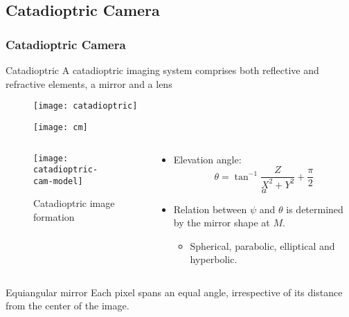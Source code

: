 \subsection{Catadioptric Camera}

\begin{frame}
\frametitle{Catadioptric Camera}
\begin{block}{Catadioptric}
A catadioptric imaging system comprises both reflective and refractive elements, a mirror
and a lens
\end{block}
\begin{figure}[!h]
\centering
\texttt{[image: catadioptric]}
\end{figure}
\end{frame}

\begin{frame}
\begin{figure}[!h]
\centering
\texttt{[image: cm]}
\end{figure}
\end{frame}

\begin{frame}
\begin{columns}
\begin{column}{.6\textwidth}
\begin{figure}[!h]
\centering
\texttt{[image: catadioptric-cam-model]}
\caption{Catadioptric image formation}
\end{figure}
\end{column}
\begin{column}{.4\textwidth}
\begin{itemize}
\item Elevation angle:
\[
\theta = \tan^{-1} \dfrac{Z}{X^{2} + Y^{2}} + \dfrac{\pi}{2}
\]
\[
a
\]
\item Relation between $\psi$ and $\theta$ is determined by the mirror shape at $M$.
\begin{itemize}
\item Spherical, parabolic, elliptical and hyperbolic.
\end{itemize}
\end{itemize}
\end{column}
\end{columns}
\end{frame}

\begin{frame}
\begin{block}{Equiangular mirror}
Each pixel spans an equal angle, irrespective of its distance from the center of the image.
\end{block}
\end{frame}

